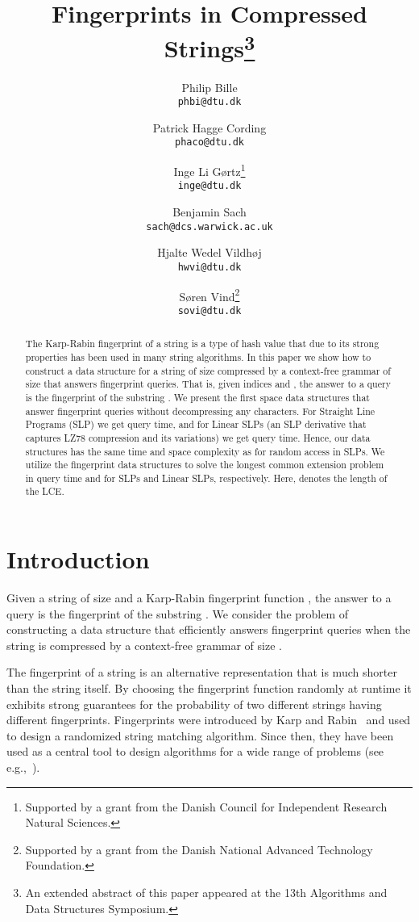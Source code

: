 \documentclass[11pt]{article}
\title{Fingerprints in Compressed Strings\footnote{An extended abstract of this paper appeared at the 13th Algorithms and Data Structures Symposium.}}
\author{Philip Bille \\ \texttt{phbi@dtu.dk} \and Patrick Hagge Cording \\ \texttt{phaco@dtu.dk} \and Inge Li G{\o}rtz\thanks{Supported by a grant from the Danish Council for Independent Research  Natural Sciences.} \\ \texttt{inge@dtu.dk} \and Benjamin Sach \\ \texttt{sach@dcs.warwick.ac.uk} \and Hjalte Wedel Vildh{\o}j \\ \texttt{hwvi@dtu.dk} \and S{\o}ren Vind\thanks{Supported by a grant from the Danish National Advanced Technology Foundation.} \\ \texttt{sovi@dtu.dk}}
\begin{document}
	
\maketitle

\begin{abstract}
\noindent The Karp-Rabin fingerprint of a string is a type of hash value that due to its strong properties has been used in many string algorithms. In this paper we show how to construct a data structure for a string  of size  compressed by a context-free grammar of size  that answers fingerprint queries. That is, given indices  and , the answer to a query is the fingerprint of the substring . We present the first  space data structures that answer fingerprint queries without decompressing any characters. For Straight Line Programs (SLP) we get  query time, and for Linear SLPs (an SLP derivative that captures LZ78 compression and its variations) we get  query time. Hence, our data structures has the same time and space complexity as for random access in SLPs. We utilize the fingerprint data structures to solve the longest common extension problem in query time  and  for SLPs and Linear SLPs, respectively. Here,  denotes the length of the LCE.
\end{abstract}


\section{Introduction}
Given a string \str of size  and a Karp-Rabin fingerprint function , the answer to a  query is the fingerprint  of the substring . We consider the problem of constructing a data structure that efficiently answers fingerprint queries when the string is compressed by a context-free grammar of size .

The fingerprint of a string is an alternative representation that is much shorter than the string itself. By choosing the fingerprint function randomly at runtime it exhibits strong guarantees for the probability of two different strings having different fingerprints. Fingerprints were introduced by Karp and Rabin~\cite{karp1987efficient} and used to design a randomized string matching algorithm. Since then, they have been used as a central tool to design algorithms for a wide range of problems (see e.g.,~\cite{amir1992efficient, andoni2006efficient, cole2003faster, cormode2005substring, cormode2007string, farach1998string, gasieniec1996randomized, kalai2002efficient, porat2009exact}). 
\end{document}
